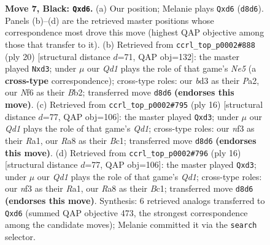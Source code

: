 \documentclass[11pt]{article}
\begin{document}
\begin{figure}[p]
\caption{\textbf{Move 7, Black: \texttt{Qxd6}.} (a) Our position; Melanie plays \texttt{Qxd6} (\texttt{d8d6}). Panels (b)--(d) are the retrieved master positions whose correspondence most drove this move (highest QAP objective among those that transfer to it). (b) Retrieved from \texttt{ccrl\_top\_p0002\#888} (ply 20) [structural distance $d$=71, QAP obj=132]: the master played \texttt{Nxd3}; under $\mu$ our \emph{Qd1} plays the role of that game's \emph{Ne5} (a \textbf{cross-type} correspondence); cross-type roles: our \emph{b}d3 as their \emph{P}a2, our \emph{N}f6 as their \emph{B}b2; transferred move \texttt{d8d6} \textbf{(endorses this move)}. (c) Retrieved from \texttt{ccrl\_top\_p0002\#795} (ply 16) [structural distance $d$=77, QAP obj=106]: the master played \texttt{Qxd3}; under $\mu$ our \emph{Qd1} plays the role of that game's \emph{Qd1}; cross-type roles: our \emph{n}f3 as their \emph{R}a1, our \emph{R}a8 as their \emph{B}c1; transferred move \texttt{d8d6} \textbf{(endorses this move)}. (d) Retrieved from \texttt{ccrl\_top\_p0002\#796} (ply 16) [structural distance $d$=77, QAP obj=106]: the master played \texttt{Qxd3}; under $\mu$ our \emph{Qd1} plays the role of that game's \emph{Qd1}; cross-type roles: our \emph{n}f3 as their \emph{R}a1, our \emph{R}a8 as their \emph{B}c1; transferred move \texttt{d8d6} \textbf{(endorses this move)}. Synthesis: 6 retrieved analogs transferred to \texttt{Qxd6} (summed QAP objective 473, the strongest correspondence among the candidate moves); Melanie committed it via the \texttt{search} selector.}
\label{fig:thought-m13}
\end{figure}

\clearpage
\end{document}
